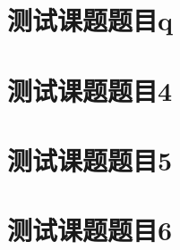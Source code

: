 \documentclass[color=green]{textbook-cn}%
\begin{document}
\begin{Project}

\makeatletter

\section{测试课题题目q}




\section{测试课题题目4}


\begin{Case}
	\item\lipsum[1][1]
	\item\lipsum[1][1]
	\item\lipsum[1][1]
	\item\lipsum[1][1]
\end{Case}


\begin{Definition}[定义名称]
	
	\lipsum[1]
\end{Definition}











\section{测试课题题目5}

\begin{Definition}[定义名称]
\lipsum[1]
\end{Definition}




\section{测试课题题目6}


\lipsum[2]

\begin{Definition}[定义名称]
\lipsum[1]
\end{Definition}


\end{Project}
\end{document}
